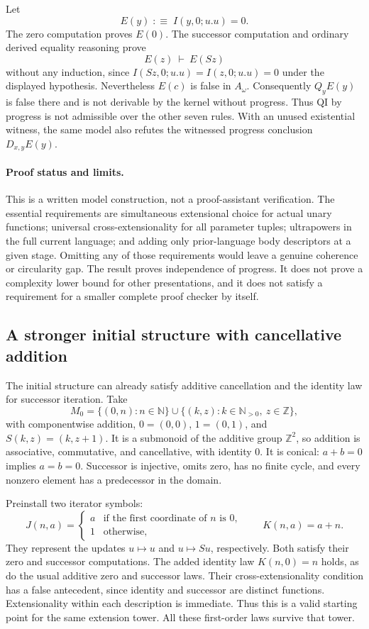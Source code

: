 \documentclass[11pt,letterpaper]{article}
\theoremstyle{definition}
\begin{document}
Let
\[
                          E(y)\;:\equiv\;I(y,0;u.u)=0.
\]
The zero computation proves $E(0)$. The successor computation and ordinary
derived equality reasoning prove
\[
                          E(z)\ \vdash\ E(Sz)
\]
without any induction, since
$I(Sz,0;u.u)=I(z,0;u.u)=0$ under the displayed hypothesis.
Nevertheless $E(c)$ is false in $A_\omega$. Consequently $Q_yE(y)$ is
false there and is not derivable by the kernel without progress.
Thus QI by progress is not admissible over the other seven rules.
With an unused existential witness, the same model also refutes the
witnessed progress conclusion $D_{x,y}E(y)$.

\paragraph{Proof status and limits.}
This is a written model construction, not a proof-assistant verification.
The essential requirements are simultaneous extensional choice for actual
unary functions; universal cross-extensionality for all parameter tuples;
ultrapowers in the full current language; and adding only prior-language
body descriptors at a given stage. Omitting any of those requirements would
leave a genuine coherence or circularity gap. The result proves independence
of progress. It does not prove a complexity lower bound for other
presentations, and it does not satisfy a requirement for a smaller complete
proof checker by itself.

\subsection{A stronger initial structure with cancellative addition}

The initial structure can already satisfy additive cancellation and the
identity law for successor iteration. Take
\[
 M_0=\{(0,n):n\in\mathbb N\}
     \cup\{(k,z):k\in\mathbb N_{>0},\ z\in\mathbb Z\},
\]
with componentwise addition, $0=(0,0)$, $1=(0,1)$, and
$S(k,z)=(k,z+1)$. It is a submonoid of the additive group $\mathbb Z^2$,
so addition is associative, commutative, and cancellative, with identity
$0$. It is conical: $a+b=0$ implies $a=b=0$. Successor is injective,
omits zero, has no finite cycle, and every nonzero element has a
predecessor in the domain.

Preinstall two iterator symbols:
\[
 J(n,a)=
 \begin{cases}
 a&\text{if the first coordinate of }n\text{ is }0,\\
 1&\text{otherwise},
 \end{cases}
 \qquad K(n,a)=a+n.
\]
They represent the updates $u\mapsto u$ and $u\mapsto Su$, respectively.
Both satisfy their zero and successor computations. The added identity
law $K(n,0)=n$ holds, as do the usual additive zero and successor laws.
Their cross-extensionality condition has a false antecedent, since
identity and successor are distinct functions. Extensionality within
each description is immediate. Thus this is a valid starting point for
the same extension tower. All these first-order laws survive that tower.
\end{document}
